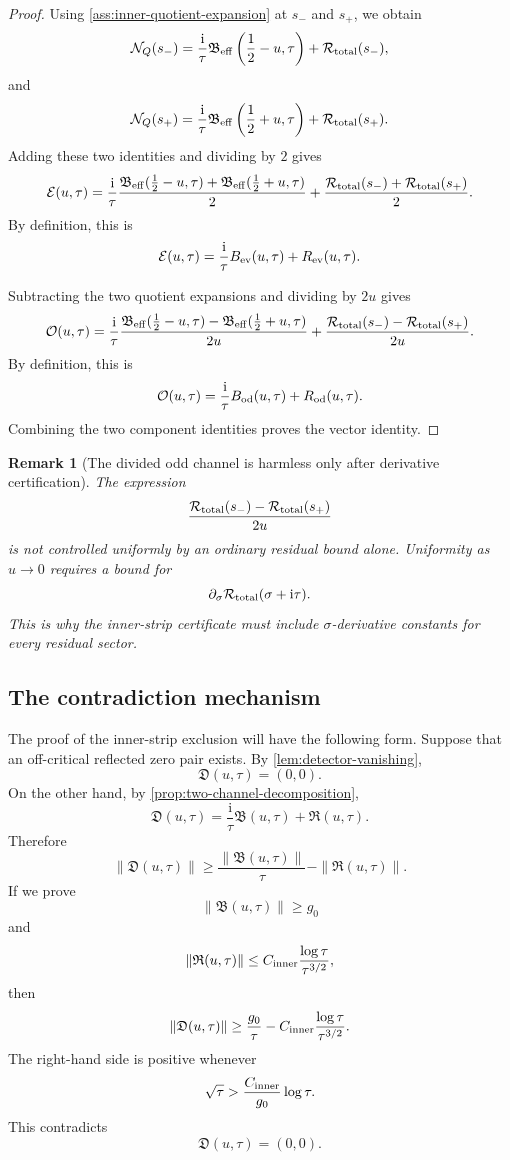 \documentclass[11pt]{article}
\newtheorem{remark}[theorem]{Remark}
\newcommand{\ii}{\mathrm{i}}
\newcommand{\NQ}{\mathcal N_Q}
\newcommand{\Rtot}{\mathcal R_{\rm total}}
\newcommand{\Beff}{\mathfrak B_{\rm eff}}
\newcommand{\Ech}{\mathcal E}
\newcommand{\Och}{\mathcal O}
\newcommand{\Dvec}{\mathfrak D}
\newcommand{\Bvec}{\mathfrak B}
\newcommand{\Rvec}{\mathfrak R}
\newcommand{\gev}{g_0}
\newcommand{\Cinner}{C_{\rm inner}}
\begin{document}
\begin{proof}
Using \cref{ass:inner-quotient-expansion} at \(s_-\) and \(s_+\), we obtain
\[
        \NQ(s_-)
        =
        \frac{\ii}{\tau}
        \Beff\left(\frac12-u,\tau\right)
        +
        \Rtot(s_-),
\]
and
\[
        \NQ(s_+)
        =
        \frac{\ii}{\tau}
        \Beff\left(\frac12+u,\tau\right)
        +
        \Rtot(s_+).
\]
Adding these two identities and dividing by \(2\) gives
\[
        \Ech(u,\tau)
        =
        \frac{\ii}{\tau}
        \frac{
        \Beff(\frac12-u,\tau)
        +
        \Beff(\frac12+u,\tau)
        }2
        +
        \frac{\Rtot(s_-)+\Rtot(s_+)}2.
\]
By definition, this is
\[
        \Ech(u,\tau)
        =
        \frac{\ii}{\tau}
        B_{\rm ev}(u,\tau)
        +
        R_{\rm ev}(u,\tau).
\]

Subtracting the two quotient expansions and dividing by \(2u\) gives
\[
        \Och(u,\tau)
        =
        \frac{\ii}{\tau}
        \frac{
        \Beff(\frac12-u,\tau)
        -
        \Beff(\frac12+u,\tau)
        }{2u}
        +
        \frac{
        \Rtot(s_-)
        -
        \Rtot(s_+)
        }{2u}.
\]
By definition, this is
\[
        \Och(u,\tau)
        =
        \frac{\ii}{\tau}
        B_{\rm od}(u,\tau)
        +
        R_{\rm od}(u,\tau).
\]
Combining the two component identities proves the vector identity.
\end{proof}

\begin{remark}[The divided odd channel is harmless only after derivative certification]
The expression
\[
        \frac{\Rtot(s_-)-\Rtot(s_+)}{2u}
\]
is not controlled uniformly by an ordinary residual bound alone.  Uniformity
as \(u\to0\) requires a bound for
\[
        \partial_\sigma \Rtot(\sigma+\ii\tau).
\]
This is why the inner-strip certificate must include \(\sigma\)-derivative
constants for every residual sector.
\end{remark}

\subsection{The contradiction mechanism}

The proof of the inner-strip exclusion will have the following form.  Suppose
that an off-critical reflected zero pair exists.  By
\cref{lem:detector-vanishing},
\[
        \Dvec(u,\tau)=(0,0).
\]
On the other hand, by \cref{prop:two-channel-decomposition},
\[
        \Dvec(u,\tau)
        =
        \frac{\ii}{\tau}\Bvec(u,\tau)
        +
        \Rvec(u,\tau).
\]
Therefore
\[
        \|\Dvec(u,\tau)\|
        \ge
        \frac{\|\Bvec(u,\tau)\|}{\tau}
        -
        \|\Rvec(u,\tau)\|.
\]
If we prove
\[
        \|\Bvec(u,\tau)\|\ge \gev
\]
and
\[
        \|\Rvec(u,\tau)\|
        \le
        \Cinner
        \frac{\log\tau}{\tau^{3/2}},
\]
then
\[
        \|\Dvec(u,\tau)\|
        \ge
        \frac{\gev}{\tau}
        -
        \Cinner
        \frac{\log\tau}{\tau^{3/2}}.
\]
The right-hand side is positive whenever
\[
        \sqrt{\tau}
        >
        \frac{\Cinner}{\gev}
        \log\tau.
\]
This contradicts
\[
        \Dvec(u,\tau)=(0,0).
\]
\end{document}

